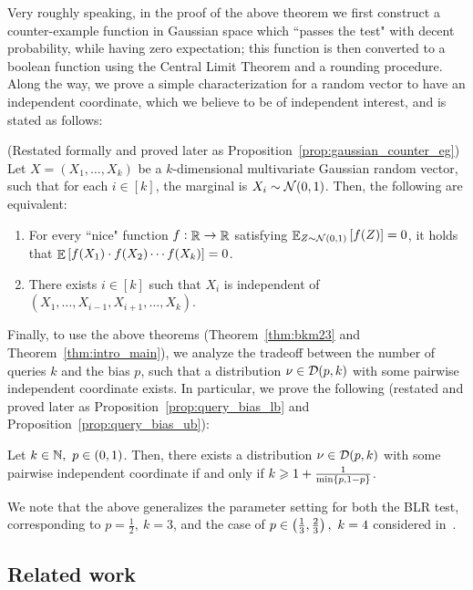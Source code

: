 Very roughly speaking, in the proof of the above theorem we first construct a counter-example function in Gaussian space which ``passes the test" with decent probability, while having zero expectation; this function is then converted to a boolean function using the Central Limit Theorem and a rounding procedure.
Along the way, we prove a simple characterization for a random vector to have an independent coordinate, which we believe to be of independent interest, and is stated as follows:

\begin{proposition} (Restated formally and proved later as Proposition~\ref{prop:gaussian_counter_eg})
	Let $X=(X_1,\dots,X_k)$ be a $k$-dimensional multivariate Gaussian random vector, such that for each $i\in [k]$, the marginal is $X_i\sim \mathcal N(0,1)$.
	Then, the following are equivalent:
	\begin{enumerate}
		\item For every ``nice" function $f:\mathop{\mathbb{R}}\to \mathop{\mathbb{R}}$ satisfying $\mathop{\mathbb{E}}_{Z\sim \mathcal N(0,1)}\left[ f(Z) \right]=0$, it holds that $\mathop{\mathbb{E}}\left[ f(X_1)\cdot f(X_2)\cdots f(X_k) \right]=0$.
		\item There exists $i\in [k]$ such that $X_i$ is independent of $(X_1,\dots,X_{i-1}, X_{i+1}, \dots, X_k)$.
	\end{enumerate}
\end{proposition}

Finally, to use the above theorems (Theorem~\ref{thm:bkm23} and Theorem~\ref{thm:intro_main}), we analyze the tradeoff between the number of queries $k$ and the bias $p$, such that a distribution $\nu\in \mathcal D(p,k)$ with some pairwise independent coordinate exists.
In particular, we prove the following (restated and proved later as Proposition~\ref{prop:query_bias_lb} and Proposition~\ref{prop:query_bias_ub}): 

\begin{proposition}\label{prop:intro_bias_query_tradeoff}
	Let $k\in \mathbb{N},\ p\in (0,1)$.
	Then, there exists a distribution $\nu \in \mathcal D(p,k)$ with some pairwise independent coordinate if and only if  $k \geqslant 1 + \frac{1}{\min\left\{ p,1-p \right\}}$.
\end{proposition}

We note that the above generalizes the parameter setting for both the BLR test, corresponding to $p=\frac{1}{2},\ k=3$, and the case of $p\in \left( \frac{1}{3},\frac{2}{3} \right),\ k=4$ considered in~\cite{BKM23b}.

\subsection{Related work}

